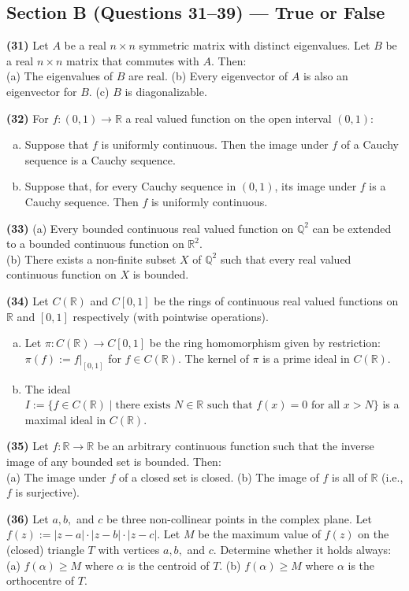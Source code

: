\documentclass[11pt,a4paper]{article}
\newcommand{\Q}{\mathbb{Q}}
\newcommand{\R}{\mathbb{R}}
\newcommand{\examsec}[1]{%
  \subsection*{#1}
  \vspace{-2pt}
}
\newcommand{\qitem}[1]{\par\medskip\noindent\textbf{#1}\hspace{0.5em}}
\begin{document}
\examsec{Section B (Questions 31--39) --- True or False}

\qitem{(31)} Let $A$ be a real $n \times n$ symmetric matrix with distinct eigenvalues. Let $B$ be a real $n \times n$ matrix that commutes with $A$. Then:\\
(a) The eigenvalues of $B$ are real. \qquad (b) Every eigenvector of $A$ is also an eigenvector for $B$. \qquad (c) $B$ is diagonalizable.

\qitem{(32)} For $f : (0, 1) \to \R$ a real valued function on the open interval $(0, 1)$:
\begin{enumerate}[(a)]
  \item Suppose that $f$ is uniformly continuous. Then the image under $f$ of a Cauchy sequence is a Cauchy sequence.
  \item Suppose that, for every Cauchy sequence in $(0, 1)$, its image under $f$ is a Cauchy sequence. Then $f$ is uniformly continuous.
\end{enumerate}

\qitem{(33)} (a) Every bounded continuous real valued function on $\Q^2$ can be extended to a bounded continuous function on $\R^2$.\\
(b) There exists a non-finite subset $X$ of $\Q^2$ such that every real valued continuous function on $X$ is bounded.

\qitem{(34)} Let $C(\R)$ and $C[0, 1]$ be the rings of continuous real valued functions on $\R$ and $[0, 1]$ respectively (with pointwise operations).
\begin{enumerate}[(a)]
  \item Let $\pi : C(\R) \to C[0, 1]$ be the ring homomorphism given by restriction: $\pi(f) := f|_{[0,1]}$ for $f \in C(\R)$. The kernel of $\pi$ is a prime ideal in $C(\R)$.
  \item The ideal $I := \{f \in C(\R) \mid \text{there exists } N \in \R \text{ such that } f(x) = 0 \text{ for all } x > N\}$ is a maximal ideal in $C(\R)$.
\end{enumerate}

\qitem{(35)} Let $f : \R \to \R$ be an arbitrary continuous function such that the inverse image of any bounded set is bounded. Then:\\
(a) The image under $f$ of a closed set is closed. \qquad (b) The image of $f$ is all of $\R$ (i.e., $f$ is surjective).

\qitem{(36)} Let $a, b,$ and $c$ be three non-collinear points in the complex plane. Let $f(z) := |z - a|\cdot|z - b|\cdot|z - c|$. Let $M$ be the maximum value of $f(z)$ on the (closed) triangle $T$ with vertices $a, b,$ and $c$. Determine whether it holds always:\\
(a) $f(\alpha) \ge M$ where $\alpha$ is the centroid of $T$. \qquad (b) $f(\alpha) \ge M$ where $\alpha$ is the orthocentre of $T$.
\end{document}

